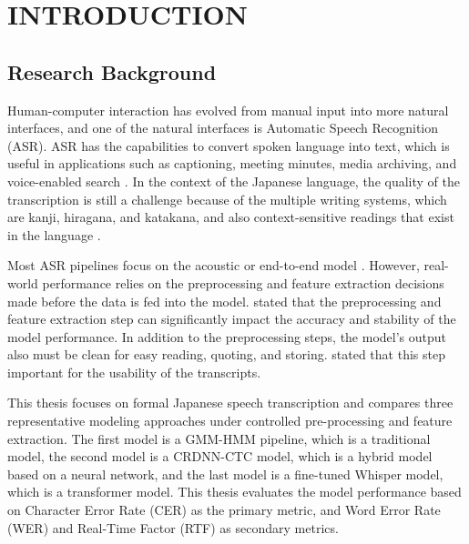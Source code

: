 \chapter{INTRODUCTION}
\label{ch:intro}

\section{Research Background}
Human-computer interaction has evolved from manual input into more natural interfaces, and one of the natural interfaces is Automatic Speech Recognition (ASR). ASR has the capabilities to convert spoken language into text, which is useful in applications such as captioning, meeting minutes, media archiving, and voice-enabled search \parencite{Xu}. In the context of the Japanese language, the quality of the transcription is still a challenge because of the multiple writing systems, which are kanji, hiragana, and katakana, and also context-sensitive readings that exist in the language \parencite{Koenecke2020}.

Most ASR pipelines focus on the acoustic or end-to-end model \parencite{xu2023recent}. However, real-world performance relies on the preprocessing and feature extraction decisions made before the data is fed into the model. \textcite{latif2020} stated that the preprocessing and feature extraction step can significantly impact the accuracy and stability of the model performance. In addition to the preprocessing steps, the model's output also must be clean for easy reading, quoting, and storing. \textcite{ando2021} stated that this step important for the usability of the transcripts.

This thesis focuses on formal Japanese speech transcription and compares three representative modeling approaches under controlled pre-processing and feature extraction. The first model is a GMM-HMM pipeline, which is a traditional model, the second model is a CRDNN-CTC model, which is a hybrid model based on a neural network, and the last model is a fine-tuned Whisper model, which is a transformer model. This thesis evaluates the model performance based on Character Error Rate (CER) as the primary metric, and Word Error Rate (WER) and Real-Time Factor (RTF) as secondary metrics.

